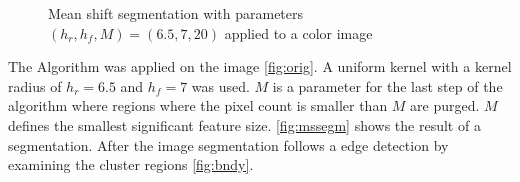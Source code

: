 \begin{figure}[ht]
  \centering {}%

  \caption{Mean shift segmentation with parameters $(h_r, h_f, M) =
    (6.5, 7, 20)$ applied to a color image}
  \label{fig:mssegm}
\end{figure}


The Algorithm was applied on the image \autoref{fig:orig}. A uniform
kernel with a kernel radius of $h_r = 6.5$ and $h_f = 7$ was used. $M$
is a parameter for the last step of the algorithm where regions where
the pixel count is smaller than $M$ are purged. $M$ defines the
smallest significant feature size.  \autoref{fig:mssegm} shows the
result of a segmentation. After the image segmentation follows a edge
detection by examining the cluster regions \autoref{fig:bndy}.

